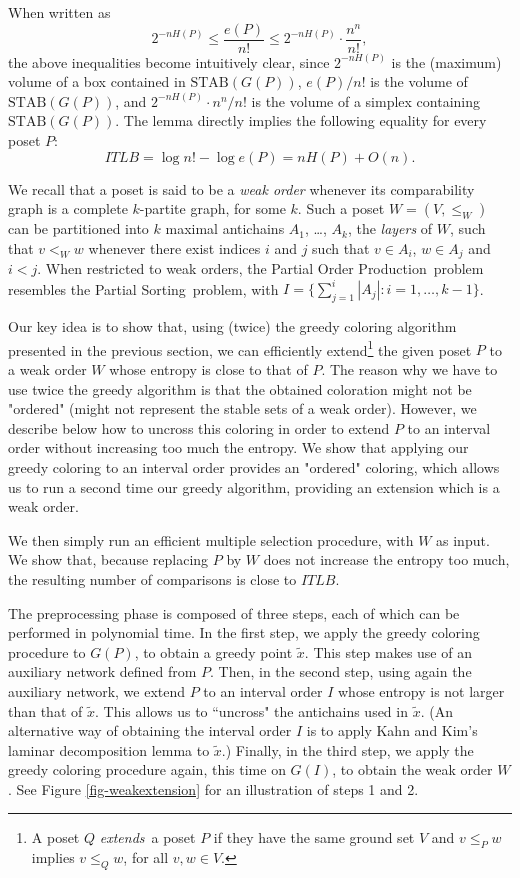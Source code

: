 \documentclass[12pt,oneside]{article}
\newcommand{\partsort}{{\sc Partial Order Production}}
\newcommand{\psort}{{\sc Partial Sorting}}
\newcommand{\STAB}{\mathrm{STAB}}
\begin{document}
When written as
$$
2^{-nH(P)} \le \frac{e(P)}{n!} \le 2^{-nH(P)} \cdot \frac{n^n}{n!},
$$
the above inequalities become intuitively clear, since $2^{-nH(P)}$ is the (maximum) volume of a box contained in $\STAB(G(P))$, $e(P) / n!$ is the volume of $\STAB(G(P))$, and $2^{-nH(P)} \cdot n^n/n!$ is the volume of a simplex containing $\STAB(G(P))$. The lemma directly implies the following equality for every poset $P$:
\begin{equation}
\label{eq-H}
ITLB=\log n! - \log e(P) = n H(P) + O(n).
\end{equation}

We recall that a poset is said to be a {\em weak order\/} whenever its comparability graph is a complete
$k$-partite graph, for some $k$. Such a poset $W = (V,\leqslant_W)$ can be partitioned into $k$ maximal
antichains $A_1$, \ldots, $A_k$, the {\em layers\/} of $W$, such that $v <_W w$ whenever there exist indices $i$
and $j$ such that $v \in A_i$, $w \in A_j$ and $i < j$. When restricted to weak orders, the \partsort\ problem
resembles the \psort\ problem, with $I = \{\sum_{j=1}^i |A_j| : i=1,\ldots, k-1\}$.

Our key idea is to show that, using (twice) the greedy coloring algorithm presented in the previous section, we can efficiently extend\footnote{A poset $Q$ {\em extends\,} a poset $P$ if
they have the same ground set $V$ and $v \leqslant_P w$ implies $v \leqslant_Q w$, for all $v, w \in V$.}
the given poset $P$ to a weak order $W$ whose entropy is close to that of $P$.  The reason why we have to use twice the greedy algorithm is that the obtained coloration might not be "ordered" (might not represent the stable sets of a weak order).  However, we describe below how to uncross this coloring in order to extend $P$ to an interval order without increasing too much the entropy.  We show that applying our greedy coloring to an interval order provides an "ordered" coloring, which allows us to run a second time our greedy algorithm, providing an extension which is a weak order.

We then simply run an efficient multiple selection procedure, with $W$ as input.
We show that, because replacing $P$ by $W$ does not increase the entropy too much, the resulting number of comparisons is close to $ITLB$.

The preprocessing phase is composed of three steps, each of which can be performed in polynomial time. In the first step, we apply the greedy coloring procedure to $G(P)$, to obtain a greedy point $\tilde x$. This step makes use of an auxiliary network defined from $P$. Then, in the second step, using again the auxiliary network, we extend $P$ to an interval order $I$ whose entropy is not larger than that of $\tilde x$. This allows us to ``uncross" the antichains used in $\tilde x$. (An alternative way of obtaining the interval order $I$ is to apply Kahn and Kim's \cite{KK95} laminar decomposition lemma to $\tilde{x}$.) Finally, in the third step, we apply the greedy coloring procedure again, this time on $G(I)$, to obtain the weak order $W$. See Figure \ref{fig-weakextension} for an illustration of steps 1 and 2.
\end{document}
